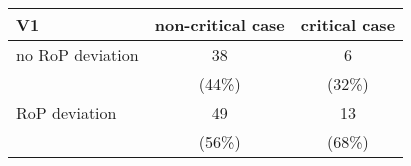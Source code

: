 \begin{table}[ht]
\centering
\begin{tabular}{l|cc}
  \hline
V1 & non-critical case & critical case \\ 
  \hline
no RoP deviation & 38 & 6 \\ 
   & (44\%) & (32\%) \\ 
  RoP deviation & 49 & 13 \\ 
   & (56\%) & (68\%) \\ 
   \hline
\end{tabular}
\end{table}
